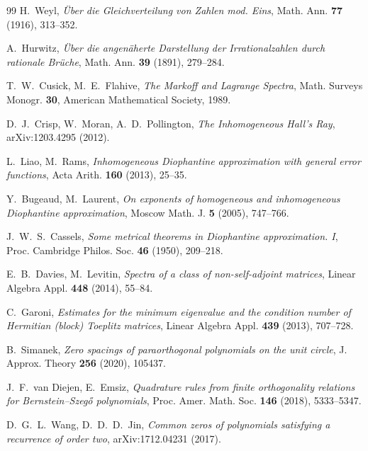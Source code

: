 \documentclass[11pt,reqno]{amsart}
\theoremstyle{plain}
\theoremstyle{definition}
\begin{document}
\begin{thebibliography}{99}
H.~Weyl,
\emph{\"Uber die Gleichverteilung von Zahlen mod. Eins},
Math. Ann. \textbf{77} (1916), 313--352.

A.~Hurwitz,
\emph{\"Uber die angen\"aherte Darstellung der Irrationalzahlen durch rationale Br\"uche},
Math. Ann. \textbf{39} (1891), 279--284.

T.~W.~Cusick, M.~E.~Flahive,
\emph{The Markoff and Lagrange Spectra},
Math. Surveys Monogr. \textbf{30}, American Mathematical Society, 1989.

D.~J.~Crisp, W.~Moran, A.~D.~Pollington,
\emph{The Inhomogeneous Hall's Ray},
arXiv:1203.4295 (2012).

L.~Liao, M.~Rams,
\emph{Inhomogeneous Diophantine approximation with general error functions},
Acta Arith. \textbf{160} (2013), 25--35.

Y.~Bugeaud, M.~Laurent,
\emph{On exponents of homogeneous and inhomogeneous Diophantine approximation},
Moscow Math. J. \textbf{5} (2005), 747--766.

J.~W.~S.~Cassels,
\emph{Some metrical theorems in Diophantine approximation. I},
Proc. Cambridge Philos. Soc. \textbf{46} (1950), 209--218.

E.~B.~Davies, M.~Levitin,
\emph{Spectra of a class of non-self-adjoint matrices},
Linear Algebra Appl. \textbf{448} (2014), 55--84.

C.~Garoni,
\emph{Estimates for the minimum eigenvalue and the condition number of Hermitian
(block) Toeplitz matrices},
Linear Algebra Appl. \textbf{439} (2013), 707--728.

B.~Simanek,
\emph{Zero spacings of paraorthogonal polynomials on the unit circle},
J. Approx. Theory \textbf{256} (2020), 105437.

J.~F.~van Diejen, E.~Emsiz,
\emph{Quadrature rules from finite orthogonality relations for Bernstein--Szeg\H{o}
polynomials},
Proc. Amer. Math. Soc. \textbf{146} (2018), 5333--5347.

D.~G.~L.~Wang, D.~D.~D.~Jin,
\emph{Common zeros of polynomials satisfying a recurrence of order two},
arXiv:1712.04231 (2017).

\end{thebibliography}
\end{document}
